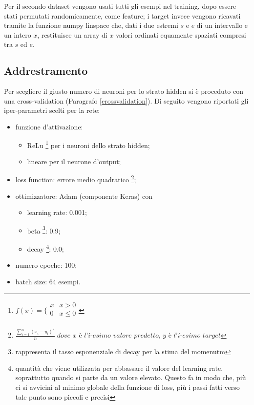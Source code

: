 \documentclass[12pt]{report}
\begin{document}
Per il secondo dataset vengono usati tutti gli esempi nel training, dopo essere stati permutati randomicamente, come feature; i target invece vengono ricavati tramite la funzione numpy linspace che, dati i due estremi $s$ e $e$ di un intervallo e un intero $x$, restituisce un array di $x$ valori ordinati equamente spaziati compresi tra $s$ ed $e$.

\subsection{Addrestramento}
Per scegliere il giusto numero di neuroni per lo strato hidden si è proceduto con una cross-validation (Paragrafo \ref{crossvalidation}). Di seguito vengono riportati gli iper-parametri scelti per la rete:
\begin{itemize}
\item{funzione d’attivazione}:

\begin{itemize}
\item{ReLu 
\footnote{$f(x) =
\bigg \{
\begin{array}{rl}
x & x > 0 \\
0 & x \leq 0 \\
\end{array}
$
} per i neuroni dello strato hidden};
\item{lineare per il neurone d'output};
\end{itemize}

\item{loss function}: errore medio quadratico \footnote{
$\displaystyle{\frac{\sum_{i=1}^n \left(x_i - y_i\right)^2}{n}} \; \textit{dove x è l'i-esimo valore predetto, y è l'i-esimo target}$
};

\item{ottimizzatore}: Adam (componente Keras) con

\begin{itemize}
\item{learning rate}: 0.001;
\item{beta \footnote{rappresenta il tasso esponenziale di decay per la stima del momenutm}}: 0.9;
\item{decay \footnote{quantità che viene utilizzata per abbassare il valore del learning rate, soprattutto quando si parte da un valore elevato. Questo fa in modo che, più ci si avvicini al minimo globale della funzione di loss, più i passi fatti verso tale punto sono piccoli e precisi}}: 0.0;
\end{itemize}

\item{numero epoche}: 100;

\item{batch size}: 64 esempi.
\end{itemize}
\end{document}
